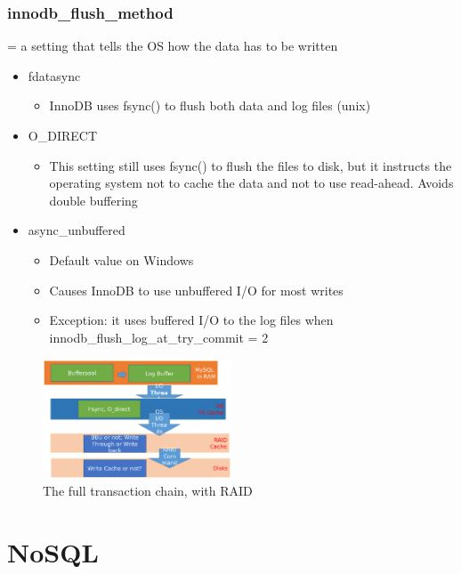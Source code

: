 \documentclass{article}
\begin{document}
\subsubsection{innodb\_flush\_method}

= a setting that tells the OS how the data has to be written

\begin{itemize}
    \item fdatasync
    \begin{itemize}
        \item InnoDB uses fsync() to flush both data and log files (unix)
    \end{itemize}
    \item O\_DIRECT
    \begin{itemize}
        \item This setting still uses fsync() to flush the files to disk, but it instructs the operating system not to cache the data and not to use read-ahead. Avoids double buffering
    \end{itemize}
    \item async\_unbuffered
    \begin{itemize}
        \item Default value on Windows
        \item Causes InnoDB to use unbuffered I/O for most writes
        \item Exception: it uses buffered I/O to the log files when innodb\_flush\_log\_at\_try\_commit = 2
    \end{itemize}
\end{itemize}

\begin{figure}[H]
    \centering
    \includegraphics[width=0.5\textwidth]{transaction-chain2.png}
    \caption{The full transaction chain, with RAID}
\end{figure}

\section{NoSQL}
\end{document}
